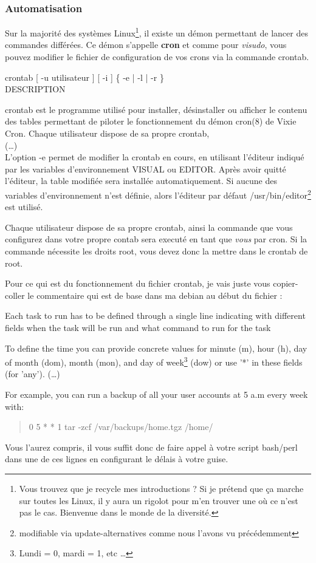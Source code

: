 \documentclass[a4paper,11pt]{article}
\newcommand{\commande}[1] {
    \begin{quote}
    \tt\raggedright #1 
    \end{quote}
}
\newcommand{\man}[2]{
    \begin{tcolorbox}[toprule=3mm,width=\textwidth,outer arc=0mm,colbacktitle=grayman,coltitle=black,colback={grayman},colframe={grayman},title={man : \tt #1}]
        \tt\raggedright #2
    \end{tcolorbox}
}
\newcommand{\mandesc}[1]{
    \begin{adjustwidth}{0.8cm}{}
        #1
    \end{adjustwidth}
}
\begin{document}
\subsubsection{Automatisation}
\par Sur la majorité des systèmes Linux\footnote{Vous trouvez que je recycle mes introductions ? Si je prétend que ça marche sur toutes les Linux, il y aura un rigolot pour m'en trouver une où ce n'est pas le cas. Bienvenue dans le monde de la diversité.}, il existe un démon permettant de lancer des commandes différées. Ce démon s'appelle \textbf{cron} et comme pour \emph{visudo}, vous pouvez modifier le fichier de configuration de vos crons via la commande crontab.
\man{crontab}{crontab [ -u utilisateur ] [ -i ] \{ -e | -l | -r \}\\
DESCRIPTION
\mandesc{crontab est le programme utilisé pour installer, désinstaller ou afficher le contenu des tables permettant de piloter le fonctionnement du démon cron(8) de Vixie Cron. Chaque utilisateur dispose de sa propre crontab,\\
(\dots)\\
L'option -e permet de modifier la crontab en cours, en utilisant l'éditeur indiqué par les variables d'environnement VISUAL ou EDITOR. Après avoir quitté l'éditeur, la table modifiée sera installée automatiquement. Si aucune des variables d'environnement n'est définie, alors l'éditeur par défaut /usr/bin/editor\footnote{modifiable via update-alternatives comme nous l'avons vu précédemment} est utilisé.}}
\par Chaque utilisateur dispose de sa propre crontab, ainsi la commande que vous configurez dans votre propre contab sera executé en tant que \emph{vous} par cron. Si la commande nécessite les droits root, vous devez donc la mettre dans le crontab de root.
\par Pour ce qui est du fonctionnement du fichier crontab, je vais juste vous copier-coller le commentaire qui est de base dans ma debian au début du fichier :
\par Each task to run has to be defined through a single line indicating with different fields when the task will be run and what command to run for the task
\par To define the time you can provide concrete values for minute (m), hour (h), day of month (dom), month (mon), and day of week\footnote{Lundi = 0, mardi = 1, etc \dots} (dow) or use '*' in these fields (for 'any'). (\dots) 
\par For example, you can run a backup of all your user accounts at 5 a.m every week with:
\commande{0 5 * * 1 tar -zcf /var/backups/home.tgz /home/}
\par Vous l'aurez compris, il vous suffit donc de faire appel à votre script bash/perl dans une de ces lignes en configurant le délais à votre guise.
\end{document}
